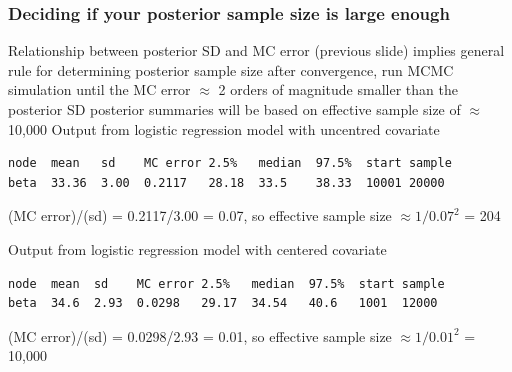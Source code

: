 \begin{frame}[fragile]
\frametitle{Deciding if your posterior sample size is large enough}
\bibig
\I Relationship between posterior SD and MC error (previous slide) implies general rule for determining posterior sample size\vspace{1mm}
\bibig
\I after convergence, run MCMC simulation until the MC error $\approx$ 2 orders of magnitude smaller than the posterior SD\vspace{1mm}
\I[$\Rightarrow$] posterior summaries will be based on effective sample size of $\approx$10,000\vspace{2mm}
\eibig
\eibig
Output from logistic regression model with uncentred covariate\vspace{-2mm}
\begin{footnotesize}
\begin{verbatim}
node  mean   sd    MC error 2.5%   median  97.5%  start sample
beta  33.36  3.00  0.2117   28.18  33.5    38.33  10001 20000
\end{verbatim}\vspace{-2mm}
(MC error)/(sd) = 0.2117/3.00 = 0.07, so effective sample size $\approx 1/0.07^2$ = 204
\end{footnotesize}

\vspace{0.4cm}

Output from logistic regression model with centered covariate\vspace{-2mm}
\begin{footnotesize}
\begin{verbatim}
node  mean  sd    MC error 2.5%   median  97.5%  start sample
beta  34.6  2.93  0.0298   29.17  34.54   40.6   1001  12000
\end{verbatim}\vspace{-2mm}
(MC error)/(sd) = 0.0298/2.93 = 0.01, so effective sample size $\approx 1/0.01^2$ = 10,000
\end{footnotesize}

\end{frame}

